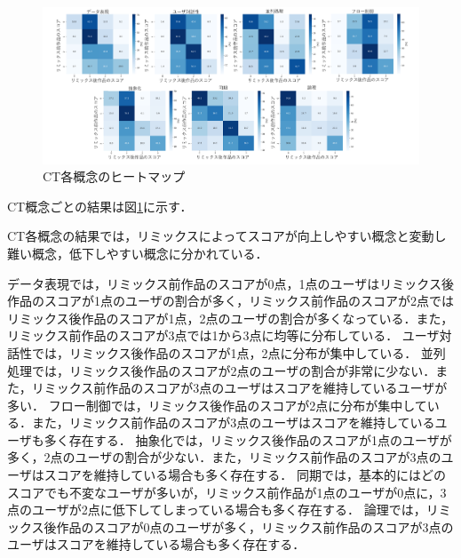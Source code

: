 \documentclass[submit,techrep,noauthor]{ipsj}
\begin{document}
\begin{figure}[t]
  \centering
  \includegraphics[width=\textwidth]{@IPSJ_SIGSE202511_Horio/fig/heatmapCTf.pdf}
  \caption{CT各概念のヒートマップ}
  \label{heatmap}
\end{figure}

CT概念ごとの結果は図\ref{heatmap}に示す．



CT各概念の結果では，リミックスによってスコアが向上しやすい概念と変動し難い概念，低下しやすい概念に分かれている．

データ表現では，リミックス前作品のスコアが0点，1点のユーザはリミックス後作品のスコアが1点のユーザの割合が多く，リミックス前作品のスコアが2点ではリミックス後作品のスコアが1点，2点のユーザの割合が多くなっている．また，リミックス前作品のスコアが3点では1から3点に均等に分布している．
ユーザ対話性では，リミックス後作品のスコアが1点，2点に分布が集中している．
並列処理では，リミックス後作品のスコアが2点のユーザの割合が非常に少ない．また，リミックス前作品のスコアが3点のユーザはスコアを維持しているユーザが多い．
フロー制御では，リミックス後作品のスコアが2点に分布が集中している．また，リミックス前作品のスコアが3点のユーザはスコアを維持しているユーザも多く存在する．
抽象化では，リミックス後作品のスコアが1点のユーザが多く，2点のユーザの割合が少ない．また，リミックス前作品のスコアが3点のユーザはスコアを維持している場合も多く存在する．
同期では，基本的にはどのスコアでも不変なユーザが多いが，リミックス前作品が1点のユーザが0点に，3点のユーザが2点に低下してしまっている場合も多く存在する．
論理では，リミックス後作品のスコアが0点のユーザが多く，リミックス前作品のスコアが3点のユーザはスコアを維持している場合も多く存在する．
\end{document}
